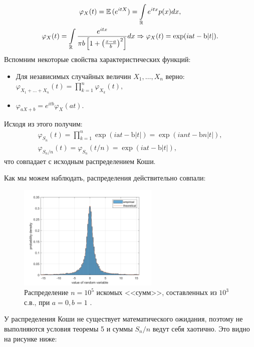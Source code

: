 \documentclass[oneside, final, 12pt]{article}
\def\E{{\mathbb{E} }\,}
\def\a{{\textrm{a}}}
\def\b{{\textrm{b}}}
\begin{document}
	$$
		\begin{gathered}	
			\varphi_X(t) = \E (e^{itX}) = \int\limits_{\mathbb{R}} e^{itx}p(x)dx, \\
			\varphi_X(t)= \int\limits_{\mathbb{R}} \dfrac{e^{itx}}
																						{\pi b\left[ 1+\left(\frac{x-a}{b}\right)^2 \right]} dx	
									\Rightarrow \varphi_X(t) = \exp(i\a t -  \b|t|).
		\end{gathered} \vspace{2mm}
	$$
	\noindent
	Вспомним некоторые свойства характеристических функций:
	\begin{itemize}
		\item Для независимых случайных величин	$X_1, \ldots, X_n$ верно:
			$
				\varphi_{X_1+\ldots+X_n}(t) =\prod\limits_{k=1}^{n}\varphi_{X_k}(t),
			$
		\item 	$\varphi_{aX+b} = e^{itb}\varphi_X(at).$
	\end{itemize}
	Исходя из этого получим:
	$$
		\begin{gathered}	
			\varphi_{S_n}(t) = \prod\limits_{k=1}^{n}  \exp(i\a t - \b|t|) = \exp(i\a nt - \b n|t|), \\
			\varphi_{S_n/n}(t) = \varphi_{S_n}(t/n) = \exp(i\a t -  \b|t|) ,
		\end{gathered}
	$$
	что совпадает с исходным распределением Коши.

	Как мы можем наблюдать, распределения действительно совпали:
	
	\begin{figure}[h!]
		\centering
		\includegraphics[width=0.6\textwidth]{../code/Task_5/pict/cauchy_sum_ex.png}
		\caption{Распределение $n=10^5$ искомых <<сумм>>, составленных из $10^3$ с.в., при $a=0, b=1$ .}
    \end{figure}

	\newpage
	У распределения Коши не существует математического ожидания, поэтому не выполняются условия 
	теоремы 5 и суммы $S_n/n$ ведут себя хаотично. Это видно на рисунке ниже:
	
\end{document}
